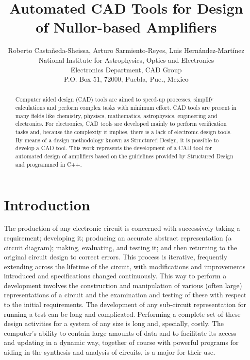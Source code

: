 \documentclass[twocolumn]{IEEEtran}
\begin{document}
\title{Automated CAD Tools for Design of Nullor-based Amplifiers}

\author{Roberto Casta\~neda-Sheissa, Arturo Sarmiento-Reyes, Luis Hern\'andez-Mart\'inez\\ National Institute for Astrophysics, Optics and Electronics\\
Electronics Department, CAD Group\\ P.O. Box 51, 72000, Puebla, Pue., Mexico}

\maketitle
\thispagestyle{empty}
\pagestyle{empty}
\begin{abstract}
Computer aided design (CAD) tools are aimed to speed-up processes, simplify calculations and perform complex tasks with minimum effort. CAD tools are present in many fields like chemistry, physiscs, mathematics, astrophysics, engineering and electronics. For electronics, CAD tools are developed mainly to perform verification tasks and, because the complexity it implies, there is a lack of electronic design tools. By means of a design methodology known as Structured Design, it is possible to develop a CAD tool. This work represents the development of a CAD tool for automated design of amplifiers based on the guidelines provided by Structured Design and programmed in C++.
\end{abstract}

\section{Introduction}
The production of any electronic circuit is concerned with successively taking a requirement; developing it; producing an accurate abstract representation (a circuit diagram); making, evaluating, and testing it; and then returning to the original circuit design to correct errors. This process is iterative, frequently extending across the lifetime of the circuit, with modifications and improvements introduced and specifications changed continuously. This way to perform a development involves the construction and manipulation of various (often large) representations of a circuit and the examination and testing of these with respect to the initial requirements. The development of any sub-circuit representation for running a test can be long and complicated. Performing a complete set of these design activities for a system of any size is long and, specially, costly. The computer's ability to contain large amounts of data and to facilitate its access and updating in a dynamic way, together of course with powerful programs for aiding in the synthesis and analysis of circuits, is a major for their use.
\end{document}
